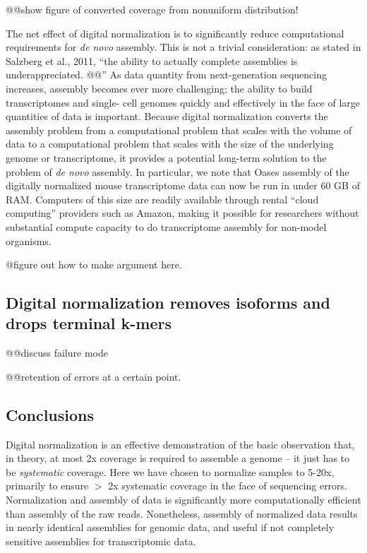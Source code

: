 \documentclass[10pt]{article}
\begin{document}
@@show figure of converted coverage from nonuniform distribution!

The net effect of digital normalization is to significantly reduce
computational requirements for {\em de novo} assembly.  This is not a
trivial consideration: as stated in Salzberg et al., 2011, ``the
ability to actually complete assemblies is underappreciated. @@'' As
data quantity from next-generation sequencing increases, assembly
becomes ever more challenging; the ability to build transcriptomes and
single- cell genomes quickly and effectively in the face of large
quantities of data is important.  Because digital normalization
converts the assembly problem from a computational problem that scales
with the volume of data to a computational problem that scales with
the size of the underlying genome or transcriptome, it provides a
potential long-term solution to the problem of {\em de novo} assembly.
In particular, we note that Oases assembly of the digitally normalized
mouse transcriptome data can now be run in under 60 GB of RAM.
Computers of this size are readily available through rental ``cloud
computing'' providers such as Amazon, making it possible for
researchers without substantial compute capacity to do transcriptome
assembly for non-model organisms.

@figure out how to make argument here.

\subsection*{Digital normalization removes isoforms and drops terminal k-mers}

@@discuss failure mode

@@retention of errors at a certain point.

\subsection*{Conclusions}

Digital normalization is an effective demonstration of the basic
observation that, in theory, at most 2x coverage is required to
assemble a genome -- it just has to be {\em systematic} coverage.
Here we have chosen to normalize samples to 5-20x, primarily to ensure
$>$ 2x systematic coverage in the face of sequencing errors.
Normalization and assembly of data is significantly more
computationally efficient than assembly of the raw reads.
Nonetheless, assembly of normalized data results in nearly identical
assemblies for genomic data, and useful if not completely sensitive
assemblies for transcriptomic data.
\end{document}
